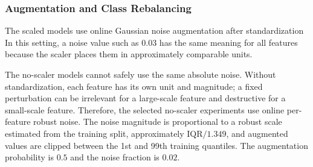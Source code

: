 \documentclass[12pt]{article}
\begin{document}
\begin{table}[H]
\centering
\caption{Main training hyperparameters used in the TabularMLP experiments.}
\label{tab:training_hyperparameters}
\end{table}


\subsubsection{Augmentation and Class Rebalancing}

The scaled models use online Gaussian noise augmentation after standardization In this setting, a noise value such as $0.03$ has the same meaning for all features because the scaler places them in approximately comparable units.

The no-scaler models cannot safely use the same absolute noise. Without standardization, each feature has its own unit and magnitude; a fixed perturbation can be irrelevant for a large-scale feature and destructive for a small-scale feature. Therefore, the selected no-scaler experiments use online per-feature robust noise. The noise magnitude is proportional to a robust scale estimated from the training split, approximately $\mathrm{IQR}/1.349$, and augmented values are clipped between the 1st and 99th training quantiles. The augmentation probability is $0.5$ and the noise fraction is $0.02$.
\end{document}
